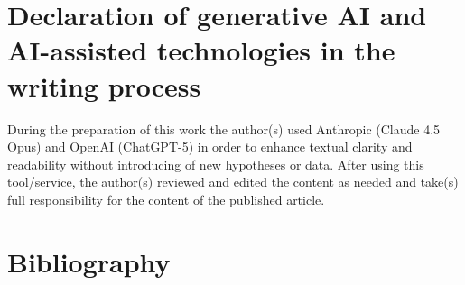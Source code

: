 \section*{Declaration of generative AI and AI-assisted technologies in the writing process}
During the preparation of this work the author(s) used Anthropic (Claude 4.5 Opus) and OpenAI (ChatGPT-5) in order to enhance textual clarity and readability without introducing of new hypotheses or data. After using this tool/service, the author(s) reviewed and edited the content as needed and take(s) full responsibility for the content of the published article.

\section*{Bibliography}

